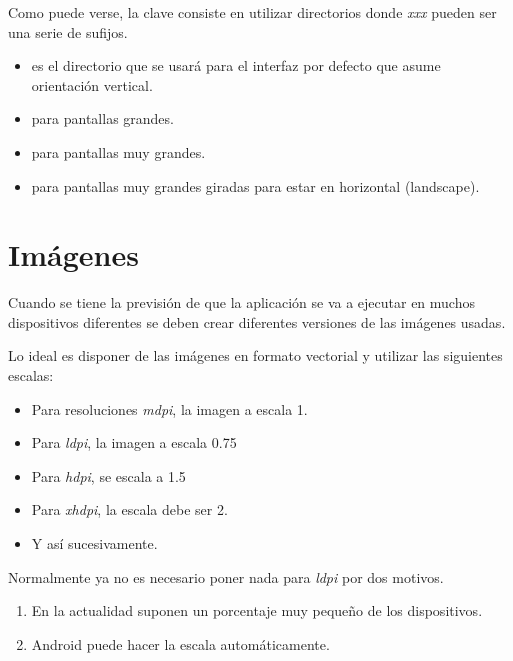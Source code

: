 \documentclass[a4paper,12pt,spanish]{sphinxmanual}
\begin{document}
Como puede verse, la clave consiste en utilizar directorios  donde \emph{xxx} pueden ser una serie de sufijos.
\begin{itemize}
\item {} 
 es el directorio que se usará para el interfaz por defecto que asume orientación vertical.

\item {} 
 para pantallas grandes.

\item {} 
 para pantallas muy grandes.

\item {} 
 para pantallas muy grandes giradas para estar en horizontal (landscape).

\end{itemize}


\section{Imágenes}
\label{tema1:imagenes}
Cuando se tiene la previsión de que la aplicación se va a ejecutar en muchos dispositivos diferentes se deben crear diferentes versiones de las imágenes usadas.

Lo ideal es disponer de las imágenes en formato vectorial y utilizar las siguientes escalas:
\begin{itemize}
\item {} 
Para resoluciones \emph{mdpi}, la imagen a escala 1.

\item {} 
Para \emph{ldpi}, la imagen a escala 0.75

\item {} 
Para \emph{hdpi}, se escala a 1.5

\item {} 
Para \emph{xhdpi}, la escala debe ser 2.

\item {} 
Y así sucesivamente.

\end{itemize}

Normalmente ya no es necesario poner nada para \emph{ldpi} por dos motivos.
\begin{enumerate}
\item {} 
En la actualidad suponen un porcentaje muy pequeño de los dispositivos.

\item {} 
Android puede hacer la escala automáticamente.

\end{enumerate}
\end{document}
